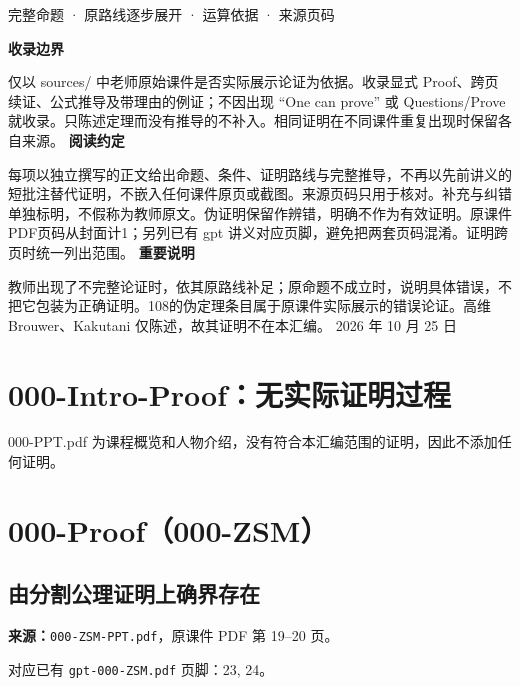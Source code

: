 
\newcommand{\LectureID}{Proof 汇编}
\makeatletter
\renewcommand{\l@subsection}{\@dottedtocline{2}{1.5em}{3.8em}}
\makeatother

\begin{titlepage}\vspace*{2cm}{\Huge 数理分析方法\par}\vspace{1cm}{\LARGE 证明详解：按老师课件路线重写\par}\vspace{1cm}完整命题 · 原路线逐步展开 · 运算依据 · 来源页码\par\vfill
\textbf{收录边界}\par
仅以 sources/ 中老师原始课件是否实际展示论证为依据。收录显式 Proof、跨页续证、公式推导及带理由的例证；不因出现 “One can prove” 或 Questions/Prove 就收录。只陈述定理而没有推导的不补入。相同证明在不同课件重复出现时保留各自来源。
\textbf{阅读约定}\par
每项以独立撰写的正文给出命题、条件、证明路线与完整推导，不再以先前讲义的短批注替代证明，不嵌入任何课件原页或截图。来源页码只用于核对。补充与纠错单独标明，不假称为教师原文。伪证明保留作辨错，明确不作为有效证明。原课件PDF页码从封面计1；另列已有 gpt 讲义对应页脚，避免把两套页码混淆。证明跨页时统一列出范围。
\textbf{重要说明}\par
教师出现了不完整论证时，依其原路线补足；原命题不成立时，说明具体错误，不把它包装为正确证明。108的伪定理条目属于原课件实际展示的错误论证。高维 Brouwer、Kakutani 仅陈述，故其证明不在本汇编。
2026 年 10 月 25 日\end{titlepage}
\tableofcontents\clearpage

\section{000-Intro-Proof：无实际证明过程}
000-PPT.pdf 为课程概览和人物介绍，没有符合本汇编范围的证明，因此不添加任何证明。

\clearpage\section{000-Proof（000-ZSM）}
\clearpage\subsection{由分割公理证明上确界存在}
\textbf{来源：}\texttt{000-ZSM-PPT.pdf}，原课件 PDF 第 19--20 页。\par
对应已有 \texttt{gpt-000-ZSM.pdf} 页脚：23, 24。\par
